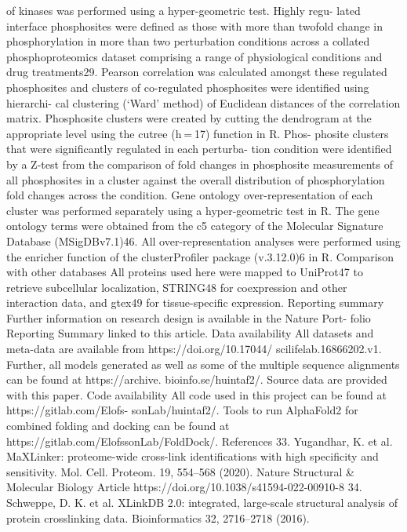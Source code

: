 of kinases was performed using a hyper-geometric test. Highly regu-
lated interface phosphosites were defined as those with more than
twofold change in phosphorylation in more than two perturbation
conditions across a collated phosphoproteomics dataset comprising
a range of physiological conditions and drug treatments29. Pearson
correlation was calculated amongst these regulated phosphosites and
clusters of co-regulated phosphosites were identified using hierarchi-
cal clustering (‘Ward’ method) of Euclidean distances of the correlation
matrix. Phosphosite clusters were created by cutting the dendrogram
at the appropriate level using the cutree (h = 17) function in R. Phos-
phosite clusters that were significantly regulated in each perturba-
tion condition were identified by a Z-test from the comparison of fold
changes in phosphosite measurements of all phosphosites in a cluster
against the overall distribution of phosphorylation fold changes across
the condition. Gene ontology over-representation of each cluster was
performed separately using a hyper-geometric test in R. The gene
ontology terms were obtained from the c5 category of the Molecular
Signature Database (MSigDBv7.1)46. All over-representation analyses
were performed using the enricher function of the clusterProfiler
package (v.3.12.0)6 in R.
Comparison with other databases
All proteins used here were mapped to UniProt47 to retrieve subcellular
localization, STRING48 for coexpression and other interaction data, and
gtex49 for tissue-specific expression.
Reporting summary
Further information on research design is available in the Nature Port-
folio Reporting Summary linked to this article.
Data availability
All datasets and meta-data are available from https://doi.org/10.17044/
scilifelab.16866202.v1. Further, all models generated as well as some
of the multiple sequence alignments can be found at https://archive.
bioinfo.se/huintaf2/. Source data are provided with this paper.
Code availability
All code used in this project can be found at https://gitlab.com/Elofs-
sonLab/huintaf2/. Tools to run AlphaFold2 for combined folding and
docking can be found at https://gitlab.com/ElofssonLab/FoldDock/.
References
33.	 Yugandhar, K. et al. MaXLinker: proteome-wide cross-link
identifications with high specificity and sensitivity. Mol. Cell.
Proteom. 19, 554–568 (2020).
Nature Structural \& Molecular Biology
Article
https://doi.org/10.1038/s41594-022-00910-8
34.	 Schweppe, D. K. et al. XLinkDB 2.0: integrated, large-scale
structural analysis of protein crosslinking data. Bioinformatics 32,
2716–2718 (2016).
